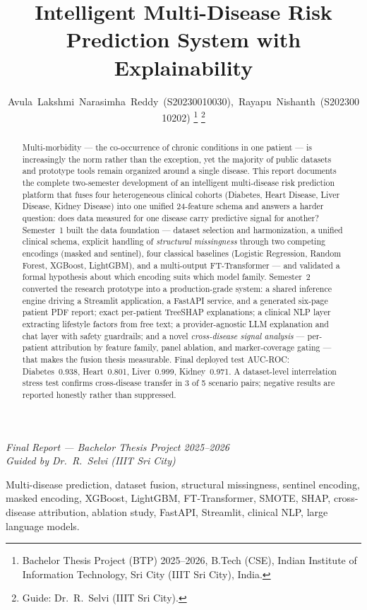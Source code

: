 \documentclass[journal]{IEEEtran}
\title{Intelligent Multi-Disease Risk Prediction System with Explainability}
\author{Avula~Lakshmi~Narasimha~Reddy~(S20230010030),~Rayapu~Nishanth~(S20230010202)%
\thanks{Bachelor Thesis Project (BTP) 2025--2026, B.Tech (CSE), Indian Institute of Information Technology, Sri City (IIIT Sri City), India.}%
\thanks{Guide: Dr.~R.~Selvi (IIIT Sri City).}%
}
\begin{document}
\maketitle

\begin{center}
\textit{Final Report --- Bachelor Thesis Project 2025--2026}\\[2pt]
\textit{Guided by Dr.~R.~Selvi (IIIT Sri City)}
\end{center}

\begin{abstract}
Multi-morbidity --- the co-occurrence of chronic conditions in one patient --- is increasingly the norm rather than the exception, yet the majority of public datasets and prototype tools remain organized around a single disease. This report documents the complete two-semester development of an intelligent multi-disease risk prediction platform that fuses four heterogeneous clinical cohorts (Diabetes, Heart Disease, Liver Disease, Kidney Disease) into one unified 24-feature schema and answers a harder question: does data measured for one disease carry predictive signal for another? Semester~1 built the data foundation --- dataset selection and harmonization, a unified clinical schema, explicit handling of \emph{structural missingness} through two competing encodings (masked and sentinel), four classical baselines (Logistic Regression, Random Forest, XGBoost, LightGBM), and a multi-output FT-Transformer --- and validated a formal hypothesis about which encoding suits which model family. Semester~2 converted the research prototype into a production-grade system: a shared inference engine driving a Streamlit application, a FastAPI service, and a generated six-page patient PDF report; exact per-patient TreeSHAP explanations; a clinical NLP layer extracting lifestyle factors from free text; a provider-agnostic LLM explanation and chat layer with safety guardrails; and a novel \emph{cross-disease signal analysis} --- per-patient attribution by feature family, panel ablation, and marker-coverage gating --- that makes the fusion thesis measurable. Final deployed test AUC-ROC: Diabetes~0.938, Heart~0.801, Liver~0.999, Kidney~0.971. A dataset-level interrelation stress test confirms cross-disease transfer in 3 of 5 scenario pairs; negative results are reported honestly rather than suppressed.
\end{abstract}

\begin{IEEEkeywords}
Multi-disease prediction, dataset fusion, structural missingness, sentinel encoding, masked encoding, XGBoost, LightGBM, FT-Transformer, SMOTE, SHAP, cross-disease attribution, ablation study, FastAPI, Streamlit, clinical NLP, large language models.
\end{IEEEkeywords}
\end{document}
